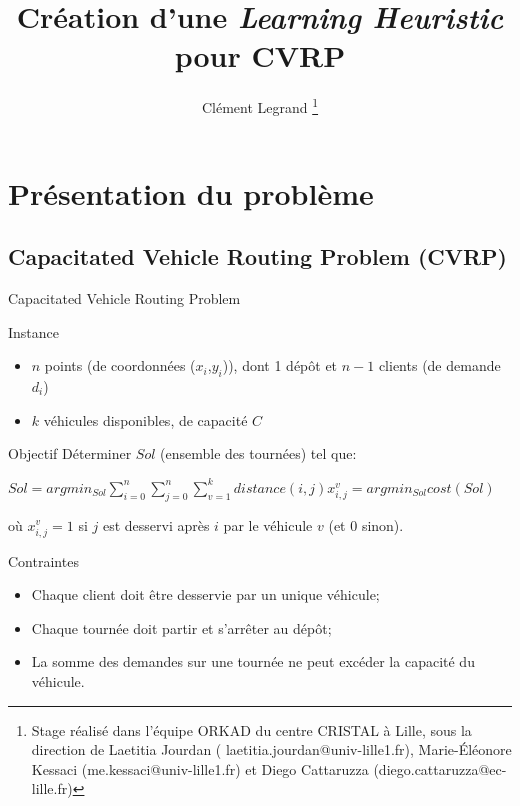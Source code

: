 \documentclass{beamer}
\title{Création d'une \emph{Learning Heuristic} pour CVRP}
\author{Clément Legrand \footnote{Stage réalisé dans l'équipe ORKAD du centre CRISTAL à Lille, sous la direction de Laetitia Jourdan ( laetitia.jourdan@univ-lille1.fr), Marie-Éléonore Kessaci (me.kessaci@univ-lille1.fr) et Diego Cattaruzza (diego.cattaruzza@ec-lille.fr)}}
\begin{document}
\begin{frame}[plain]
\titlepage
\end{frame}

\section{Présentation du problème}

\subsection{Capacitated Vehicle Routing Problem (CVRP)}
\footnotesize
\begin{frame}{Capacitated Vehicle Routing Problem}
\begin{block}{Instance}
\begin{itemize}
\item $n$ points (de coordonnées ($x_i$,$y_i$)), dont 1 dépôt et $n-1$ clients (de  demande $d_i$)
\item $k$ véhicules disponibles, de capacité $C$ 
\end{itemize}
\end{block}

\begin{exampleblock}{Objectif}
Déterminer $Sol$ (ensemble des tournées) tel que:

\centering
$ Sol = argmin_{Sol} \sum_{i = 0}^{n} \sum_{j = 0}^{n} \sum_{v = 1}^{k} distance(i,j) x_{i,j}^v = argmin_{Sol}cost(Sol)$

où $x_{i,j}^v = 1$ si $j$ est desservi après $i$ par le véhicule $v$ (et 0 sinon). 



\begin{alertblock}{Contraintes}
\begin{itemize}
\item Chaque client doit être desservie par un unique véhicule;
\item Chaque tournée doit partir et s'arrêter au dépôt;
\item La somme des demandes sur une tournée ne peut excéder la capacité du véhicule.
\end{itemize}
\end{alertblock}


\end{exampleblock}
\end{frame}
\end{document}
